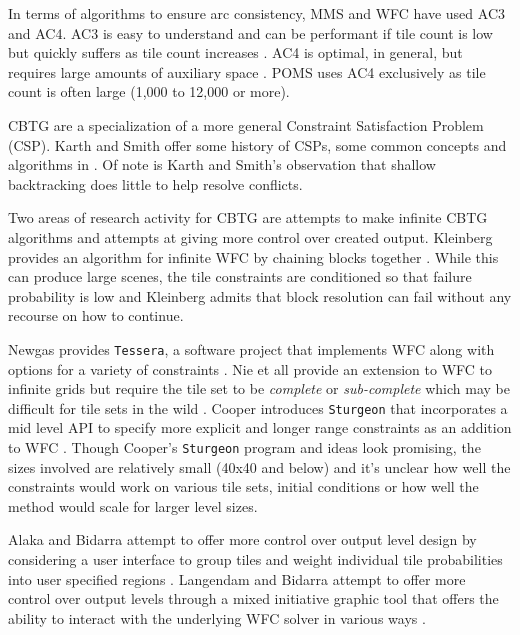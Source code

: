 In terms of algorithms to ensure arc consistency, MMS and WFC have used AC3 and AC4.
AC3 is easy to understand and can be performant if tile count is low but quickly suffers as tile count increases \cite{Wallace1993WhyAI}.
AC4 is optimal, in general, but requires large amounts of auxiliary space \cite{Mohr_Henderson_1986}.
POMS uses AC4 exclusively as tile count is often large (1,000 to 12,000 or more).


CBTG
are a specialization of a more general Constraint Satisfaction Problem (CSP).
Karth and Smith offer some history of CSPs, some common concepts and algorithms in \cite{Karth_Smith_2017, Karth_Smith_2022}.
Of note is Karth and Smith's observation that shallow backtracking does little to help resolve conflicts.


Two areas of research activity for CBTG are attempts to make infinite CBTG algorithms
and attempts at giving more control over created output.
Kleinberg provides an algorithm for infinite WFC by chaining blocks together \cite{Kleinberg_2019}.
While this can produce large scenes, the tile constraints are conditioned so that failure probability is low and Kleinberg admits
that block resolution can fail without any recourse on how to continue.

Newgas provides \texttt{Tessera}, a software project that implements WFC along with options for a variety of constraints \cite{Newgas_2021}.
Nie et all provide an extension to WFC to infinite grids but require the tile set to be \textit{complete} or \textit{sub-complete}
which may be difficult for tile sets in the wild \cite{Nie_etall_2023}.
Cooper introduces \texttt{Sturgeon} that incorporates a mid level API to specify more explicit and longer range constraints as an addition
to WFC \cite{Cooper_2022}.
Though Cooper's \texttt{Sturgeon} program and ideas look promising, the sizes involved are relatively small (40x40 and below)
and it's unclear how well the constraints would work on various tile sets, initial conditions or how well the method would scale
for larger level sizes.

Alaka and Bidarra attempt to offer more control over output level design by considering a user interface to group tiles and
weight individual tile probabilities into user specified regions \cite{Alaka_Bidarra_Rafael_2023}.
Langendam and Bidarra attempt to offer more control over output levels through a mixed initiative graphic tool that offers
the ability to interact with the underlying WFC solver in various ways \cite{Langendam_etall_2022}.

